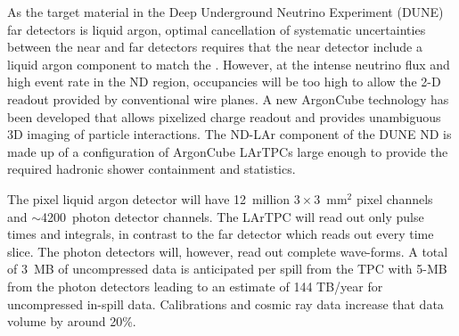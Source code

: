 \documentclass[../main-v1.tex]{subfiles}
\begin{document}
 As the target material in the Deep Underground Neutrino Experiment (DUNE) far detectors is liquid argon, optimal cancellation of systematic uncertainties between the near and far detectors requires that the near detector include a liquid argon component to match the .  However, at the intense neutrino flux and high event rate in the ND region, occupancies will be too high to allow the 2-D readout provided by conventional wire planes. A new ArgonCube  technology has been developed that allows pixelized charge readout  and provides unambiguous 3D imaging of  particle interactions.  The ND-LAr component of the DUNE ND is made up of a configuration of ArgonCube LArTPCs  large enough to provide the required hadronic shower containment and statistics.  %
 
 The pixel liquid argon detector will have 12~million $3\times 3$~mm$^2$ pixel channels and $\sim$4200~photon detector channels.  The LArTPC will read out only pulse times and integrals, in contrast to the far detector which reads out every time slice.  The photon detectors will, however, read out complete wave-forms.   A total of 3~MB of uncompressed data is anticipated per spill from the TPC with 5-MB from the photon detectors leading to an estimate of 144 TB/year for uncompressed in-spill data. Calibrations and cosmic ray data increase that data volume by around 20\%.


\end{document}
